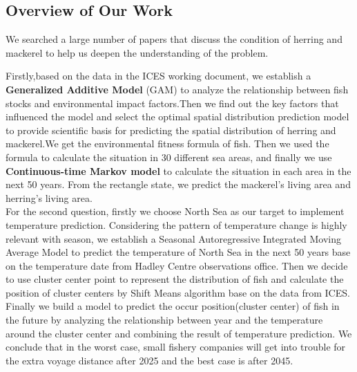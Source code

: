 \documentclass{mcmthesis}
\begin{document}
\subsection{Overview of Our Work}
We searched a large number of papers that discuss the condition of herring and mackerel to help us deepen the understanding of the problem.

Firstly,based on the data in the ICES working document\cite{3}\cite{4}, we establish a \textbf{Generalized Additive Model }(GAM) to analyze the relationship between fish stocks and environmental impact factors.Then we find out the key factors that influenced the model and select the optimal spatial distribution prediction model to provide scientific basis for predicting the spatial distribution of herring and mackerel.We get the environmental fitness formula of fish. Then we used the formula to calculate the situation in 30 different sea areas, and finally we use \textbf{Continuous-time Markov model} to calculate the situation in each area in the next 50 years. From the rectangle state, we  predict the mackerel’s living area and herring’s living area.\\

For the second question, firstly we choose North Sea as our target to implement temperature prediction. Considering the pattern of temperature change is highly relevant with season, we establish a Seasonal Autoregressive Integrated Moving Average Model to predict the temperature of North Sea in the next 50 years base on the temperature date from Hadley Centre observations office. Then we decide to use cluster center point to represent the distribution of fish and calculate the position of cluster centers by Shift Means algorithm   base on the data from ICES. Finally we build a model to predict the occur position(cluster center) of fish in the future by analyzing the relationship between year and the temperature around the cluster center and combining the result of temperature prediction. We conclude that in the worst case, small fishery companies will get into trouble for the extra voyage distance after 2025 and the best case is after 2045.\\
\end{document}
